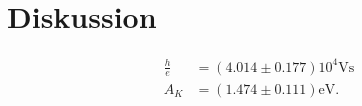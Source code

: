 \section{Diskussion}
\label{sec:Diskussion}

\begin{align*}
    \frac{h}{e} &= (4.014 \pm 0.177) 10^4 \si{\volt\second} \\
    A_K &=  (1.474 \pm 0.111) \si{\electronvolt}.
\end{align*}